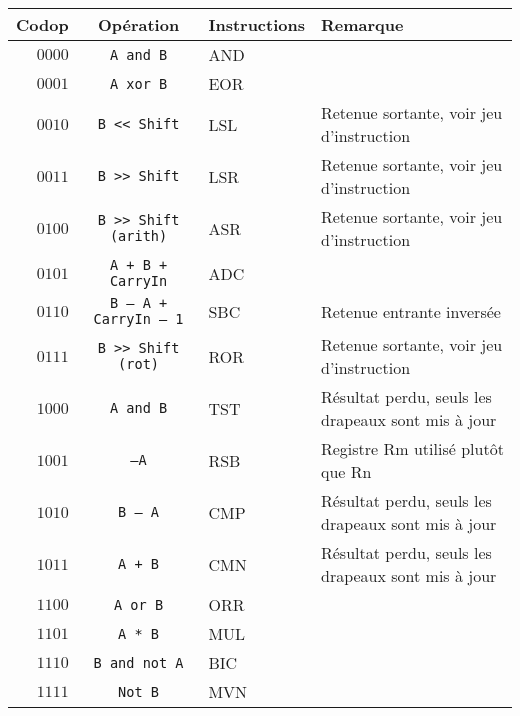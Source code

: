 \documentclass{article}
\begin{document}
    \begin{tabular}{|r|c|l|l|}
        \hline
        \textbf{Codop} & \textbf{Opération}            & \textbf{Instructions} & \textbf{Remarque}                                  \\
        \hline

        $0000$         & \texttt{A and B}            & AND                &                                                    \\
        \hline
        $0001$         & \texttt{A xor B}            & EOR                &                                                    \\
        \hline
        $0010$         & \texttt{B << Shift}         & LSL                & Retenue sortante, voir jeu d'instruction           \\
        \hline
        $0011$         & \texttt{B >> Shift}         & LSR                & Retenue sortante, voir jeu d'instruction           \\
        \hline
        $0100$         & \texttt{B >> Shift (arith)}  & ASR                & Retenue sortante, voir jeu d'instruction           \\
        \hline
        $0101$         & \texttt{A + B + CarryIn}     & ADC                &                                                    \\
        \hline
        $0110$         & \texttt{B – A + CarryIn – 1} & SBC                & Retenue entrante inversée                          \\
        \hline
        $0111$         & \texttt{B >> Shift (rot)}    & ROR                & Retenue sortante, voir jeu d'instruction           \\
        \hline
        $1000$         & \texttt{A and B}            & TST                & Résultat perdu, seuls les drapeaux sont mis à jour \\
        \hline
        $1001$         & \texttt{–A}                & RSB                & Registre Rm utilisé plutôt que Rn                  \\
        \hline
        $1010$         & \texttt{B – A}             & CMP                & Résultat perdu, seuls les drapeaux sont mis à jour \\
        \hline
        $1011$         & \texttt{A + B}             & CMN                & Résultat perdu, seuls les drapeaux sont mis à jour \\
        \hline
        $1100$         & \texttt{A or B}             & ORR                &                                                    \\
        \hline
        $1101$         & \texttt{A * B}             & MUL                &                                                    \\
        \hline
        $1110$         & \texttt{B and not A}        & BIC                &                                                    \\
        \hline
        $1111$         & \texttt{Not B}             & MVN                &                                                    \\
        \hline
    \end{tabular}
\end{document}
